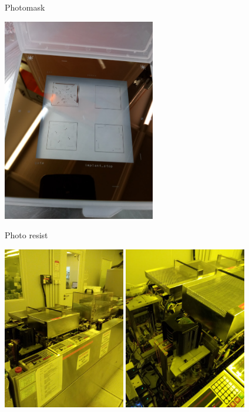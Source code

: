 \documentclass[9pt]{beamer}
\begin{document}
\begin{frame}{Photomask}
\begin{center}
\includegraphics[width=0.5\textwidth]{images/20181207_113845_Burst01.jpg}
\end{center}
\end{frame}

\begin{frame}{Photo resist}
\begin{center}
\includegraphics[width=0.4\textwidth]{images/20181128_154907.jpg}
\includegraphics[width=0.4\textwidth]{images/20181128_154911.jpg}
\end{center}
\end{frame}
\end{document}
